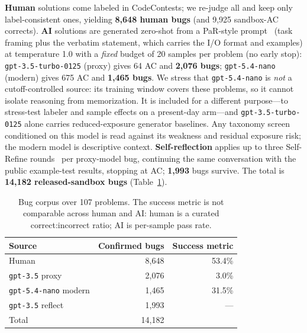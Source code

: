 \documentclass[conference]{IEEEtran}
\begin{document}
\textbf{Human} solutions come labeled in CodeContests; we re-judge all and keep
only label-consistent ones, yielding \textbf{8{,}648 human bugs} (and 9{,}925
sandbox-AC corrects). \textbf{AI} solutions are generated zero-shot from a PaR-style
prompt~\cite{wei2026evaluating} (task framing plus the verbatim statement, which
carries the I/O format and examples) at temperature 1.0 with a \emph{fixed} budget
of 20 samples per problem (no early stop): \texttt{gpt-3.5-turbo-0125} (proxy) gives
64 AC and \textbf{2{,}076 bugs}; \texttt{gpt-5.4-nano} (modern) gives 675 AC and
\textbf{1{,}465 bugs}. We stress that \texttt{gpt-5.4-nano} is \emph{not} a
cutoff-controlled source: its training window covers these problems, so it cannot
isolate reasoning from memorization. It is included for a different purpose---to
stress-test labeler and sample effects on a present-day arm---and
\texttt{gpt-3.5-turbo-0125} alone carries reduced-exposure generator baselines. Any
taxonomy screen conditioned on this model is read against its weakness and residual
exposure risk; the modern model is descriptive context. \textbf{Self-reflection} applies up to three Self-Refine
rounds~\cite{madaan2023selfrefine} per proxy-model bug, continuing the same
conversation with the public example-test results, stopping at AC; \textbf{1{,}993}
bugs survive. The total is \textbf{14{,}182 released-sandbox bugs}
(Table~\ref{tab:corpus}).

\begin{table}[t]
\centering
\caption{Bug corpus over 107 problems. The success metric is not comparable across
human and AI: human is a curated correct:incorrect ratio; AI is per-sample pass rate.}
\label{tab:corpus}
\begin{tabular}{lrr}
\toprule
Source & Confirmed bugs & Success metric\\
\midrule
Human & 8{,}648 & 53.4\%\\
\texttt{gpt-3.5} proxy & 2{,}076 & 3.0\%\\
\texttt{gpt-5.4-nano} modern & 1{,}465 & 31.5\%\\
\texttt{gpt-3.5} reflect & 1{,}993 & ---\\
\midrule
Total & 14{,}182 &\\
\bottomrule
\end{tabular}
\end{table}
\end{document}
